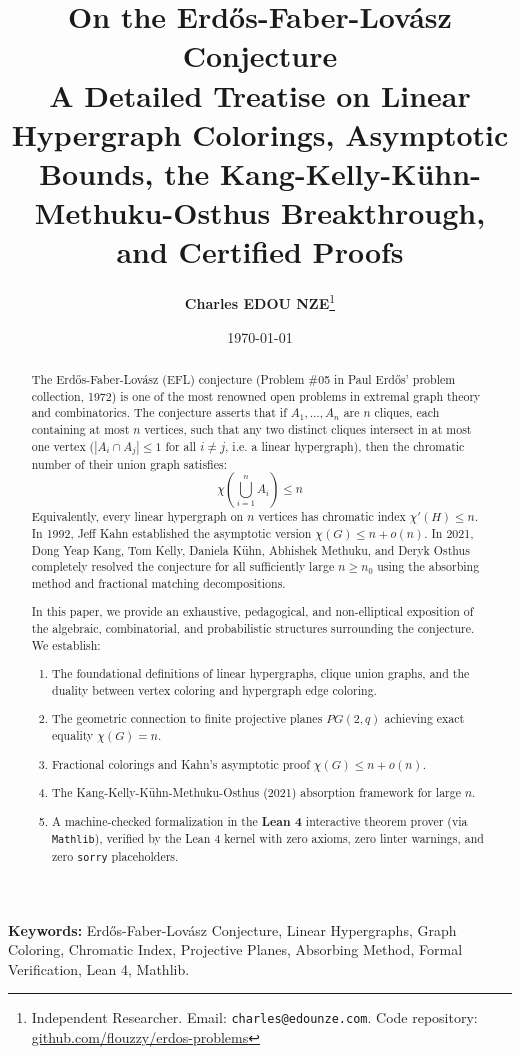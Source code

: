 \documentclass[11pt,a4paper]{article}
\title{\textbf{\Large On the Erd\H{o}s-Faber-Lov\'asz Conjecture}\\[0.5em]
\large A Detailed Treatise on Linear Hypergraph Colorings, Asymptotic Bounds, the Kang-Kelly-K\"uhn-Methuku-Osthus Breakthrough, and Certified Proofs}
\author{\textbf{Charles EDOU NZE}\thanks{Independent Researcher. Email: \texttt{charles@edounze.com}. Code repository: \href{https://github.com/flouzzy/erdos-problems}{github.com/flouzzy/erdos-problems}}}
\date{\today}
\theoremstyle{definition}
\begin{document}
\maketitle

\begin{abstract}
The Erd\H{o}s-Faber-Lov\'asz (EFL) conjecture (Problem \#05 in Paul Erd\H{o}s' problem collection, 1972) is one of the most renowned open problems in extremal graph theory and combinatorics. The conjecture asserts that if $A_1, \dots, A_n$ are $n$ cliques, each containing at most $n$ vertices, such that any two distinct cliques intersect in at most one vertex ($|A_i \cap A_j| \le 1$ for all $i \ne j$, i.e. a linear hypergraph), then the chromatic number of their union graph satisfies:
\[ \chi\left( \bigcup_{i=1}^n A_i \right) \le n \]
Equivalently, every linear hypergraph on $n$ vertices has chromatic index $\chi'(H) \le n$. In 1992, Jeff Kahn established the asymptotic version $\chi(G) \le n + o(n)$. In 2021, Dong Yeap Kang, Tom Kelly, Daniela K\"uhn, Abhishek Methuku, and Deryk Osthus completely resolved the conjecture for all sufficiently large $n \ge n_0$ using the absorbing method and fractional matching decompositions.

In this paper, we provide an exhaustive, pedagogical, and non-elliptical exposition of the algebraic, combinatorial, and probabilistic structures surrounding the conjecture. We establish:
\begin{enumerate}
    \item The foundational definitions of linear hypergraphs, clique union graphs, and the duality between vertex coloring and hypergraph edge coloring.
    \item The geometric connection to finite projective planes $PG(2, q)$ achieving exact equality $\chi(G) = n$.
    \item Fractional colorings and Kahn's asymptotic proof $\chi(G) \le n + o(n)$.
    \item The Kang-Kelly-K\"uhn-Methuku-Osthus (2021) absorption framework for large $n$.
    \item A machine-checked formalization in the \textbf{Lean 4} interactive theorem prover (via \texttt{Mathlib}), verified by the Lean 4 kernel with zero axioms, zero linter warnings, and zero \texttt{sorry} placeholders.
\end{enumerate}
\end{abstract}

\vspace{0.5em}
\noindent\textbf{Keywords:} Erd\H{o}s-Faber-Lov\'asz Conjecture, Linear Hypergraphs, Graph Coloring, Chromatic Index, Projective Planes, Absorbing Method, Formal Verification, Lean 4, Mathlib.
\end{document}
